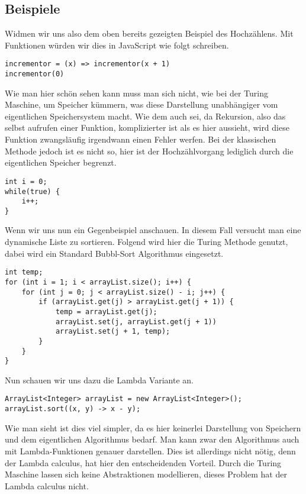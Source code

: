 \subsection{Beispiele}
Widmen wir uns also dem oben bereits gezeigten Beispiel des Hochzählens. Mit Funktionen würden wir dies in JavaScript wie folgt schreiben.
\begin{verbatim}
incrementor = (x) => incrementor(x + 1)
incrementor(0)
\end{verbatim}
Wie man hier schön sehen kann muss man sich nicht, wie bei der Turing Maschine, um Speicher kümmern, was diese Darstellung unabhängiger vom eigentlichen Speichersystem macht. Wie dem auch sei, da Rekursion, also das selbst aufrufen einer Funktion, komplizierter ist als es hier aussieht, wird diese Funktion zwangsläufig irgendwann einen Fehler werfen. Bei der klassischen Methode jedoch ist es nicht so, hier ist der Hochzählvorgang lediglich durch die eigentlichen Speicher begrenzt.
\begin{verbatim}
int i = 0;
while(true) {
	i++;
}
\end{verbatim}
Wenn wir uns nun ein Gegenbeispiel anschauen. In diesem Fall versucht man eine dynamische Liste zu sortieren. Folgend wird hier die Turing Methode genutzt, dabei wird ein Standard Bubbl-Sort Algorithmus eingesetzt.\newpage
\begin{verbatim}
int temp;
for (int i = 1; i < arrayList.size(); i++) {
	for (int j = 0; j < arrayList.size() - i; j++) {
		if (arrayList.get(j) > arrayList.get(j + 1)) {
			temp = arrayList.get(j);
			arrayList.set(j, arrayList.get(j + 1))
			arrayList.set(j + 1, temp);    	
		}
	}
}
\end{verbatim}
Nun schauen wir uns dazu die Lambda Variante an.
\begin{verbatim}
ArrayList<Integer> arrayList = new ArrayList<Integer>();
arrayList.sort((x, y) -> x - y);
\end{verbatim}
Wie man sieht ist dies viel simpler, da es hier keinerlei Darstellung von Speichern und dem eigentlichen Algorithmus bedarf. Man kann zwar den Algorithmus auch mit Lambda-Funktionen genauer darstellen. Dies ist allerdings nicht nötig, denn der Lambda calculus, hat hier den entscheidenden Vorteil. Durch die Turing Maschine lassen sich keine Abstraktionen modellieren, dieses Problem hat der Lambda calculus nicht.